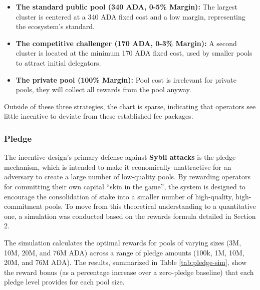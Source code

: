 \documentclass[11pt, letterpaper]{article}
\begin{document}
\begin{itemize}
	\item \textbf{The standard public pool (340 ADA, 0-5\% Margin):} The largest cluster is centered at a
	      340 ADA fixed cost and a low margin, representing the ecosystem's standard.
	\item \textbf{The competitive challenger (170 ADA, 0-3\% Margin):} A second cluster is located at the
	      minimum 170 ADA fixed cost, used by smaller pools to attract initial delegators.
	\item \textbf{The private pool (100\% Margin):} Pool cost is irrelevant for private pools, they will
	      collect all rewards from the pool anyway.
\end{itemize}


Outside of these three strategies, the chart is sparse, indicating that operators see little incentive to
deviate from these established fee packages.

\subsubsection{Pledge}

The incentive design's primary defense against \textbf{Sybil attacks} is the
pledge mechanism, which is intended to make it economically unattractive for an
adversary to create a large number of low-quality pools. By rewarding operators
for committing their own capital ``skin in the game'', the system is designed
to encourage the consolidation of stake into a smaller number of high-quality,
high-commitment pools. To move from this theoretical understanding to a
quantitative one, a simulation was conducted based on the rewards formula
detailed in Section 2.

The simulation calculates the optimal rewards for pools of varying sizes (3M,
10M, 20M, and 76M ADA) across a range of pledge amounts (100k, 1M, 10M, 20M,
and 76M ADA). The results, summarized in Table \ref{tab:pledge-sim}, show the
reward bonus (as a percentage increase over a zero-pledge baseline) that each
pledge level provides for each pool size.
\end{document}
